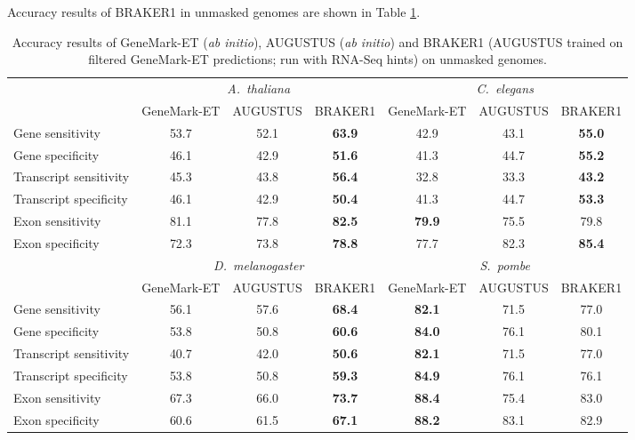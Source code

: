 \documentclass[a4paper,10pt]{report}
\begin{document}
Accuracy results of BRAKER1 in unmasked genomes are shown in Table \ref{unmasked}.

\begin{table}
\begin{center}
 \begin{scriptsize}
 \begin{tabular}{|l|ccc|ccc|}
 \hline
& \multicolumn{3}{|c|}{\textit{A.~thaliana}} & \multicolumn{3}{|c|}{\textit{C.~elegans}}\\
& GeneMark-ET & AUGUSTUS & BRAKER1 & GeneMark-ET & AUGUSTUS & BRAKER1\\
\hline
Gene sensitivity        & 53.7 & 52.1 & \textbf{63.9} & 42.9 & 43.1 & \textbf{55.0}\\
Gene specificity        & 46.1 & 42.9 & \textbf{51.6} & 41.3 & 44.7 & \textbf{55.2}\\
Transcript sensitivity  & 45.3 & 43.8 & \textbf{56.4} & 32.8 & 33.3 & \textbf{43.2}\\
Transcript specificity  & 46.1 & 42.9 & \textbf{50.4} & 41.3 & 44.7 & \textbf{53.3}\\
Exon sensitivity        & 81.1 & 77.8 & \textbf{82.5} & \textbf{79.9} & 75.5 & 79.8\\
Exon specificity        & 72.3 & 73.8 & \textbf{78.8} & 77.7 & 82.3 & \textbf{85.4}\\
\hline
& \multicolumn{3}{|c|}{\textit{D.~melanogaster}} & \multicolumn{3}{|c|}{\textit{S.~pombe}}\\
& GeneMark-ET & AUGUSTUS & BRAKER1 & GeneMark-ET & AUGUSTUS & BRAKER1\\
\hline
Gene sensitivity       & 56.1 & 57.6 & \textbf{68.4} & \textbf{82.1} & 71.5 & 77.0\\
Gene specificity       & 53.8 & 50.8 & \textbf{60.6} & \textbf{84.0} & 76.1 & 80.1\\
Transcript sensitivity & 40.7 & 42.0 & \textbf{50.6} & \textbf{82.1} & 71.5 & 77.0\\
Transcript specificity & 53.8 & 50.8 & \textbf{59.3} & \textbf{84.9} & 76.1 & 76.1\\
Exon sensitivity       & 67.3 & 66.0 & \textbf{73.7} & \textbf{88.4} & 75.4 & 83.0\\
Exon specificity       & 60.6 & 61.5 & \textbf{67.1} & \textbf{88.2} & 83.1 & 82.9\\
\hline
 \end{tabular}
\end{scriptsize}
\end{center}
\caption{Accuracy results of GeneMark-ET (\textit{ab initio}), AUGUSTUS (\textit{ab initio}) and BRAKER1 (AUGUSTUS trained on filtered GeneMark-ET predictions; run with RNA-Seq hints) on unmasked genomes.\label{unmasked}}
\end{table}
\end{document}
